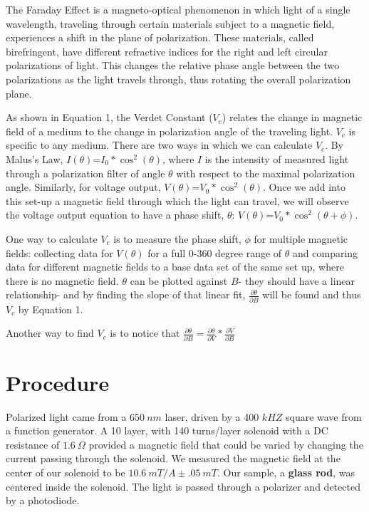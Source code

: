 \documentclass[prb,preprint]{revtex4-1}
\begin{document}
{The Faraday Effect is a magneto-optical phenomenon in which light of a single wavelength, traveling through certain materials subject to a magnetic field, experiences a shift in the plane of polarization. These materials, called birefringent, have different refractive indices for the right and left circular polarizations of light. This changes the relative phase angle between the two polarizations as the light travels through, thus rotating the overall polarization plane.

As shown in Equation 1, the Verdet Constant ($V_{c}$) relates the change in magnetic field of a medium to the change in polarization angle of the traveling light.  $V_{c}$ is specific to any medium.  There are two ways in which we can calculate $V_{c}$.  By Malus's Law, $I(\theta)$=$I_{0}*\cos^{2}(\theta)$, where $I$ is the intensity of measured light through a polarization filter of angle $\theta$ with respect to the maximal polarization angle.  Similarly, for voltage output, $V(\theta)$=$V_{0}*\cos^{2}(\theta)$.  Once we add into this set-up a magnetic field through which the light can travel, we will observe the voltage output equation to have a phase shift, $\theta$:  $V(\theta)$=$V_{0}*\cos^{2}(\theta+\phi)$.

One way to calculate $V_{c}$ is to measure the phase shift, $\phi$ for multiple magnetic fields:  collecting data for $V(\theta)$ for a full 0-360 degree range of $\theta$ and comparing data for different magnetic fields to a base data set of the same set up, where there is no magnetic field.  $\theta$ can be plotted against $B$- they should have a linear relationship- and by finding the slope of that linear fit, $\frac{\partial \theta}{\partial B}$ will be found and thus $V_{c}$ by Equation 1.}

{Another way to find $V_{c}$ is to notice that $\frac{\partial \theta}{\partial B}= \frac{\partial \theta}{\partial V}*\frac{\partial V}{\partial B}$}

\section{Procedure}
{Polarized light came from a $650\ nm$ laser, driven by a 400 $kHZ$ square wave from a function generator. A 10 layer, with 140 turns/layer solenoid with a DC resistance of $1.6\ \Omega$ provided a magnetic field that could be varied by changing the current passing through the solenoid.  We measured the magnetic field at the center of our solenoid to be $10.6\ mT/A \pm .05\ mT.$ Our sample, a {\bf glass rod}, was centered inside the solenoid. The light is passed through a polarizer and detected by a photodiode. }
\end{document}

